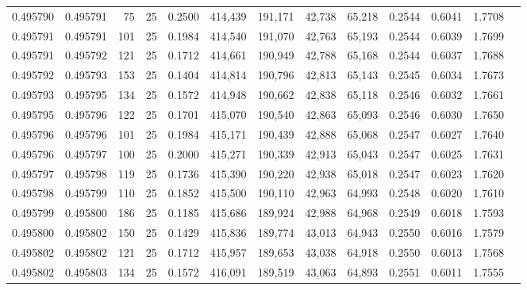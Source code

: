 \begin{tabular}{rrrrrrrrrrrrr}
0.495790 & 0.495791 &    75 &  25 &                                     0.2500 & 414,439 & 191,171 &  42,738 &  65,218 & 0.2544 & 0.6041 & 1.7708 \\
0.495791 & 0.495791 &   101 &  25 &                                     0.1984 & 414,540 & 191,070 &  42,763 &  65,193 & 0.2544 & 0.6039 & 1.7699 \\
0.495791 & 0.495792 &   121 &  25 &                                     0.1712 & 414,661 & 190,949 &  42,788 &  65,168 & 0.2544 & 0.6037 & 1.7688 \\
0.495792 & 0.495793 &   153 &  25 &                                     0.1404 & 414,814 & 190,796 &  42,813 &  65,143 & 0.2545 & 0.6034 & 1.7673 \\
0.495793 & 0.495795 &   134 &  25 &                                     0.1572 & 414,948 & 190,662 &  42,838 &  65,118 & 0.2546 & 0.6032 & 1.7661 \\
0.495795 & 0.495796 &   122 &  25 &                                     0.1701 & 415,070 & 190,540 &  42,863 &  65,093 & 0.2546 & 0.6030 & 1.7650 \\
0.495796 & 0.495796 &   101 &  25 &                                     0.1984 & 415,171 & 190,439 &  42,888 &  65,068 & 0.2547 & 0.6027 & 1.7640 \\
0.495796 & 0.495797 &   100 &  25 &                                     0.2000 & 415,271 & 190,339 &  42,913 &  65,043 & 0.2547 & 0.6025 & 1.7631 \\
0.495797 & 0.495798 &   119 &  25 &                                     0.1736 & 415,390 & 190,220 &  42,938 &  65,018 & 0.2547 & 0.6023 & 1.7620 \\
0.495798 & 0.495799 &   110 &  25 &                                     0.1852 & 415,500 & 190,110 &  42,963 &  64,993 & 0.2548 & 0.6020 & 1.7610 \\
0.495799 & 0.495800 &   186 &  25 &                                     0.1185 & 415,686 & 189,924 &  42,988 &  64,968 & 0.2549 & 0.6018 & 1.7593 \\
0.495800 & 0.495802 &   150 &  25 &                                     0.1429 & 415,836 & 189,774 &  43,013 &  64,943 & 0.2550 & 0.6016 & 1.7579 \\
0.495802 & 0.495802 &   121 &  25 &                                     0.1712 & 415,957 & 189,653 &  43,038 &  64,918 & 0.2550 & 0.6013 & 1.7568 \\
0.495802 & 0.495803 &   134 &  25 &                                     0.1572 & 416,091 & 189,519 &  43,063 &  64,893 & 0.2551 & 0.6011 & 1.7555 \\

\end{tabular}
